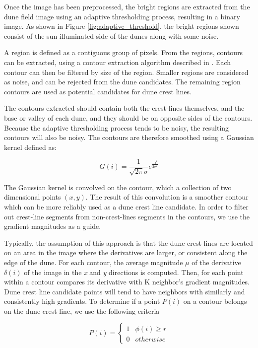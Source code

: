 Once the image has been preprocessed, the bright regions are extracted from the dune field image using an adaptive thresholding process, resulting in a binary image. As shown in Figure \ref{fig:adaptive_threshold}, the bright regions shown consist of the sun illuminated side of the dunes along with some noise. 

A region is defined as a contiguous group of pixels. From the regions, contours can be extracted, using a contour extraction algorithm described in \cite{opencv_library}. Each contour can then be filtered by size of the region. Smaller regions are considered as noise, and can be rejected from the dune candidates. The remaining region contours are used as potential candidates for dune crest lines.

The contours extracted should contain both the crest-lines themselves, and the base or valley of each dune, and they should be on opposite sides of the contours. Because the adaptive thresholding process tends to be noisy, the resulting contours will also be noisy. The contours are therefore smoothed using a Gaussian kernel defined as:

\begin{equation}
G\left(i\right)=\frac{1}{\sqrt{2\pi}\sigma}e^{\frac{-i^{2}}{2\sigma^{2}}}
\end{equation}

The Gaussian kernel is convolved on the contour, which a collection of two dimensional points $(x,y)$. The result of this convolution is a smoother contour which can be more reliably used as a dune crest line candidate. In order to filter out crest-line segments from non-crest-lines segments in the contours, we use the gradient magnitudes as a guide.

Typically, the assumption of this approach is that the dune crest lines are located on an area in the image where the derivatives are larger, or consistent along the edge of the dune. For each contour, the average magnitude $\mu$ of the derivative $\delta(i)$ of the image in the \emph{x} and \emph{y} directions is computed. Then, for each point within a contour compares its derivative with K neighbor's gradient magnitudes. Dune crest line candidate points will tend to have neighbors with similarly and consistently high gradients. To determine if a point $P(i)$ on a contour belongs on the dune crest line, we use the following criteria

\begin{equation}
P\left(i\right)=\begin{cases}
	1 & \phi(i)\geq r\\
	0 & otherwise
\end{cases}
\end{equation}

